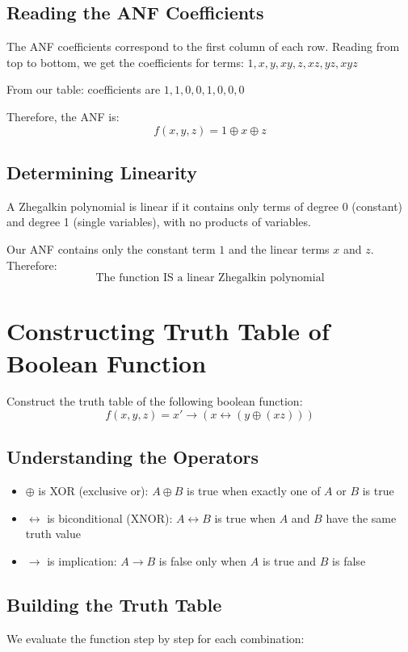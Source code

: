 \documentclass[11pt]{article}
\begin{document}
\newpage
\subsection{Reading the ANF Coefficients}
\label{sec:org5e1ac54}
The ANF coefficients correspond to the first column of each row. Reading from top to bottom, we get the coefficients for terms: \(1, x, y, xy, z, xz, yz, xyz\)

From our table: coefficients are \(1, 1, 0, 0, 1, 0, 0, 0\)

Therefore, the ANF is:
\[
\boxed{f(x,y,z) = 1 \oplus x \oplus z}
\]
\subsection{Determining Linearity}
\label{sec:org134e61f}
A Zhegalkin polynomial is linear if it contains only terms of degree 0 (constant) and degree 1 (single variables), with no products of variables.

Our ANF contains only the constant term \(1\) and the linear terms \(x\) and \(z\). Therefore:
\[
\boxed{\text{The function IS a linear Zhegalkin polynomial}}
\]

\newpage
\section{Constructing Truth Table of Boolean Function}
\label{sec:orgdf80f60}
Construct the truth table of the following boolean function:
\[
f(x, y, z) = x' \to (x \leftrightarrow (y \oplus (xz)))
\]
\subsection{Understanding the Operators}
\label{sec:org3fabc91}
\begin{itemize}
\item \(\oplus\) is XOR (exclusive or): \(A \oplus B\) is true when exactly one of \(A\) or \(B\) is true
\item \(\leftrightarrow\) is biconditional (XNOR): \(A \leftrightarrow B\) is true when \(A\) and \(B\) have the same truth value
\item \(\to\) is implication: \(A \to B\) is false only when \(A\) is true and \(B\) is false
\end{itemize}
\subsection{Building the Truth Table}
\label{sec:org24ff897}
We evaluate the function step by step for each combination:
\end{document}
